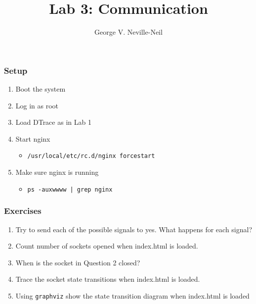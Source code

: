 \documentclass[pdftex]{beamer}
\begin{document}

\title{Lab 3: Communication}
\author[shortname]{George V. Neville-Neil}

\begin{frame}[fragile]
  \frametitle{Setup}
  \begin{enumerate}
  \item Boot the system
  \item Log in as root
  \item Load DTrace as in Lab 1
  \item Start nginx
    \begin{itemize}
    \item \verb|/usr/local/etc/rc.d/nginx forcestart|
    \end{itemize}
  \item Make sure nginx is running
    \begin{itemize}
    \item \verb+ps -auxwwww | grep nginx+
    \end{itemize}
  \end{enumerate}
\end{frame}

\begin{frame}[fragile]
  \frametitle{Exercises}
  \begin{enumerate}
  \item Try to send each of the possible signals to yes.  What happens
    for each signal?
  \item Count number of sockets opened when index.html is loaded.
  \item When is the socket in Question 2 closed?
  \item Trace the socket state transitions when index.html is loaded.
  \item Using \texttt{graphviz} show the state transition diagram when
    index.html is loaded
  \end{enumerate}
\end{frame}
\end{document}
